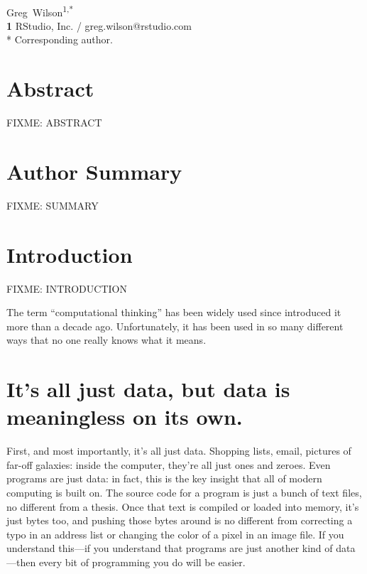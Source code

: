 \documentclass[10pt,letterpaper]{article}
\newcommand{\rulemajor}[1]{\section{#1}}
\begin{document}
\vspace*{0.2in}

\begin{flushleft}
{\Large
\textbf{}
}
\newline
\\
{Greg~Wilson}\textsuperscript{1,*}
\\
\textbf{1} RStudio, Inc. / greg.wilson@rstudio.com
\\
\bigskip
* Corresponding author.
\end{flushleft}

\section*{Abstract}

FIXME: ABSTRACT

\section*{Author Summary}

FIXME: SUMMARY

\section*{Introduction}

FIXME: INTRODUCTION

The term ``computational thinking'' has been widely used since \cite{Wing2006}
introduced it more than a decade ago.  Unfortunately, it has been used in so
many different ways that no one really knows what it means.

\rulemajor{It's all just data, but data is meaningless on its own.}

First, and most importantly, it's all just data.  Shopping lists, email,
pictures of far-off galaxies: inside the computer, they're all just ones and
zeroes.  Even programs are just data: in fact, this is the key insight that all
of modern computing is built on.  The source code for a program is just a bunch
of text files, no different from a thesis.  Once that text is compiled or loaded
into memory, it's just bytes too, and pushing those bytes around is no different
from correcting a typo in an address list or changing the color of a pixel in an
image file.  If you understand this---if you understand that programs are just
another kind of data---then every bit of programming you do will be easier.
\end{document}
